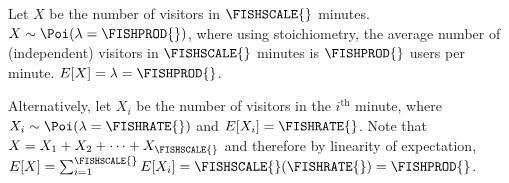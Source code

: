 Let $X$ be the number of visitors in $\FISHSCALE{}$ minutes. $X\sim\Poi(\lambda = \FISHPROD{})$, where using stoichiometry, the average number of (independent) visitors in $\FISHSCALE{}$ minutes is $\FISHPROD{}$ users per minute. $E[X] = \lambda = \FISHPROD{}$.

Alternatively, let $X_i$ be the number of visitors in the $i^{\text{th}}$ minute, where $X_i\sim\Poi(\lambda = \FISHRATE{})$ and $E[X_i] = \FISHRATE{}$. Note that $X = X_1 + X_2 + \dots + X_{\FISHSCALE{}}$ and therefore by linearity of expectation, $E[X]= \sum_{i=1}^{\FISHSCALE{}} E[X_i] = \FISHSCALE{} (\FISHRATE{}) = \FISHPROD{}$.